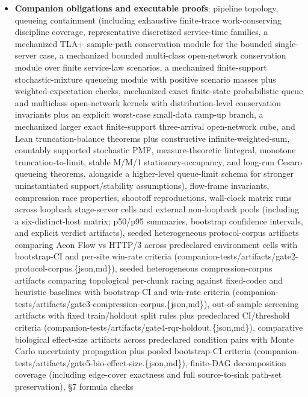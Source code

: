 \documentclass[
]{article}
\providecommand{\tightlist}{%
  \setlength{\itemsep}{0pt}\setlength{\parskip}{0pt}}
\begin{document}
\begin{itemize}
\tightlist
\item
  \textbf{Companion obligations and executable proofs}: pipeline
  topology, queueing containment (including exhaustive finite-trace
  work-conserving discipline coverage, representative discretized
  service-time families, a mechanized TLA+ sample-path conservation
  module for the bounded single-server case, a mechanized bounded
  multi-class open-network conservation module over finite service-law
  scenarios, a mechanized finite-support stochastic-mixture queueing
  module with positive scenario masses plus weighted-expectation checks,
  mechanized exact finite-state probabilistic queue and multiclass
  open-network kernels with distribution-level conservation invariants
  plus an explicit worst-case small-data ramp-up branch, a mechanized
  larger exact finite-support three-arrival open-network cube, and Lean
  truncation-balance theorems plus constructive infinite-weighted-sum,
  countably supported stochastic PMF, measure-theoretic lintegral,
  monotone truncation-to-limit, stable M/M/1 stationary-occupancy, and
  long-run Cesaro queueing theorems, alongside a higher-level
  queue-limit schema for stronger uninstantiated support/stability
  assumptions), flow-frame invariants, compression race properties,
  shootoff reproductions, wall-clock matrix runs across loopback
  stage-server cells and external non-loopback pools (including a
  six-distinct-host matrix; p50/p95 summaries, bootstrap confidence
  intervals, and explicit verdict artifacts), seeded heterogeneous
  protocol-corpus artifacts comparing Aeon Flow vs HTTP/3 across
  predeclared environment cells with bootstrap-CI and per-site win-rate
  criteria
  (companion-tests/artifacts/gate2-protocol-corpus.\{json,md\}), seeded
  heterogeneous compression-corpus artifacts comparing topological
  per-chunk racing against fixed-codec and heuristic baselines with
  bootstrap-CI and win-rate criteria
  (companion-tests/artifacts/gate3-compression-corpus.\{json,md\}),
  out-of-sample screening artifacts with fixed train/holdout split rules
  plus predeclared CI/threshold criteria
  (companion-tests/artifacts/gate4-rqr-holdout.\{json,md\}), comparative
  biological effect-size artifacts across predeclared condition pairs
  with Monte Carlo uncertainty propagation plus pooled bootstrap-CI
  criteria
  (companion-tests/artifacts/gate5-bio-effect-size.\{json,md\}),
  finite-DAG decomposition coverage (including edge-cover exactness and
  full source-to-sink path-set preservation), §7 formula checks

\end{itemize}
\end{document}
